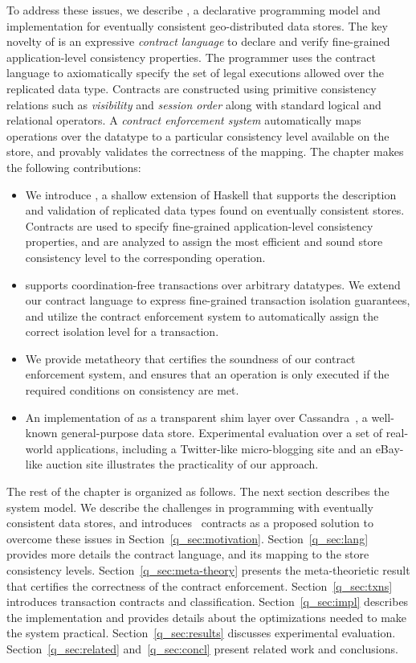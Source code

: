 To address these issues, we describe \quelea, a declarative programming model
and implementation for eventually consistent geo-distributed data stores. The
key novelty of \quelea is an expressive \emph{contract language} to declare and
verify fine-grained application-level consistency properties. The programmer
uses the contract language to axiomatically specify the set of legal executions
allowed over the replicated data type. Contracts are constructed using
primitive consistency relations such as \emph{visibility} and \emph{session
order} along with standard logical and relational operators. A \emph{contract
enforcement system} automatically maps operations over the datatype to a
particular consistency level available on the store, and provably validates the
correctness of the mapping.  The chapter makes the following contributions:

\begin{itemize}
\item We introduce \quelea, a shallow extension of Haskell that supports the
	description and validation of replicated data types found on eventually
	consistent stores. Contracts are used to specify fine-grained
	application-level consistency properties, and are analyzed to assign the most
	efficient and sound store consistency level to the corresponding operation.
\item \quelea supports coordination-free transactions over arbitrary datatypes.
	We extend our contract language to express fine-grained transaction isolation
	guarantees, and utilize the contract enforcement system to automatically
	assign the correct isolation level for a transaction.
\item We provide metatheory that certifies the soundness of our contract
	enforcement system, and ensures that an operation is only executed if the
	required conditions on consistency are met.
\item An implementation of \quelea as a transparent shim layer over
	Cassandra~\cite{Lakshman2010}, a well-known general-purpose data store.
	Experimental evaluation over a set of real-world applications, including a
	Twitter-like micro-blogging site and an eBay-like auction site illustrates
	the practicality of our approach.
\end{itemize}

The rest of the chapter is organized as follows. The next section describes the
system model.  We describe the challenges in programming with eventually
consistent data stores, and introduces \quelea\ contracts as a proposed
solution to overcome these issues in Section~\ref{q_sec:motivation}.
Section~\ref{q_sec:lang} provides more details the contract language, and its
mapping to the store consistency levels. Section~\ref{q_sec:meta-theory}
presents the meta-theorietic result that certifies the correctness of the
\quelea contract enforcement. Section~\ref{q_sec:txns} introduces transaction
contracts and classification. Section~\ref{q_sec:impl} describes the
implementation and provides details about the optimizations needed to make the
system practical. Section~\ref{q_sec:results} discusses experimental
evaluation. Section~\ref{q_sec:related} and~\ref{q_sec:concl} present related
work and conclusions.


